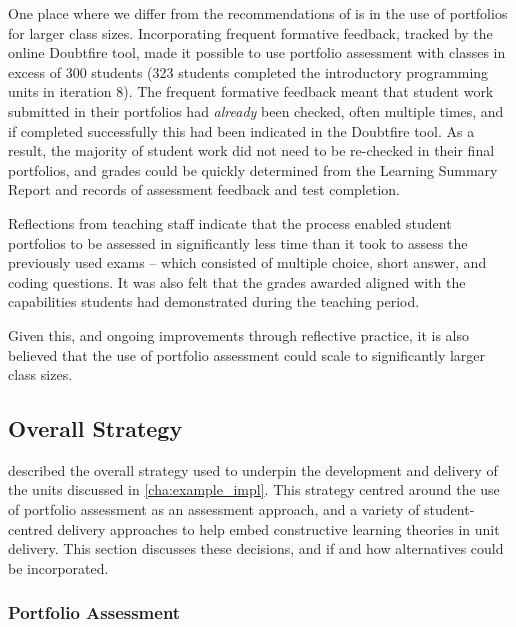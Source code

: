 One place where we differ from the recommendations of \citet{Biggs:2007} is in the use of portfolios for larger class sizes. Incorporating frequent formative feedback, tracked by the online Doubtfire tool, made it possible to use portfolio assessment with classes in excess of 300 students (323 students completed the introductory programming units in iteration 8). The frequent formative feedback meant that student work submitted in their portfolios had \emph{already} been checked, often multiple times, and if completed successfully this had been indicated in the Doubtfire tool. As a result, the majority of student work did not need to be re-checked in their final portfolios, and grades could be quickly determined from the Learning Summary Report and records of assessment feedback and test completion.

Reflections from teaching staff indicate that the process enabled student portfolios to be assessed in significantly less time than it took to assess the previously used exams -- which consisted of multiple choice, short answer, and coding questions. It was also felt that the grades awarded aligned with the capabilities students had demonstrated during the teaching period.

Given this, and ongoing improvements through reflective practice, it is also believed that the use of portfolio assessment could scale to significantly larger class sizes.



\subsection{Overall Strategy} %
\label{sub:overall_strategy}

 described the overall strategy used to underpin the development and delivery of the units discussed in \cref{cha:example_impl}. This strategy centred around the use of portfolio assessment as an assessment approach, and a variety of  student-centred delivery approaches to help embed constructive learning theories in unit delivery. This section discusses these decisions, and if and how alternatives could be incorporated.

\subsubsection{Portfolio Assessment} %
 \label{ssub:portfolio_assessment}

